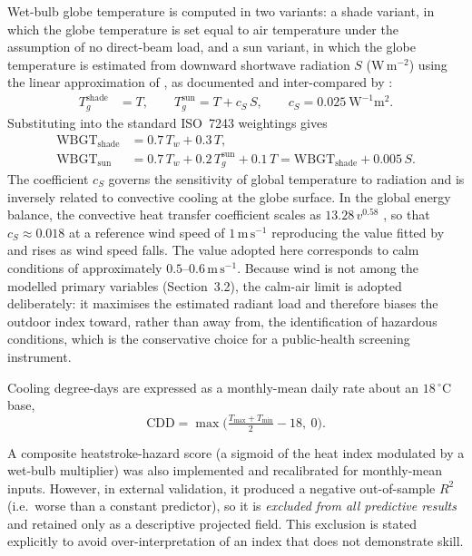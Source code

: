 \documentclass[pdflatex,sn-basic,lineno]{sn-jnl}
\newcommand{\degC}{\ensuremath{^{\circ}\mathrm{C}}}
\begin{document}
Wet-bulb globe temperature is computed in two variants: a shade variant, in
which the globe temperature is set equal to air temperature under the
assumption of no direct-beam load, and a sun variant, in which the globe
temperature is estimated from downward shortwave radiation $S$
(W\,m$^{-2}$) using the linear approximation of \citet{tonouchi2006}, as
documented and inter-compared by
\citet{lemke2012}:
\begin{align}
T_g^{\text{shade}} &= T, \qquad
T_g^{\text{sun}} = T + c_S\,S, \qquad c_S = 0.025\ \mathrm{W^{-1}m^{2}}.
\end{align}
Substituting into the standard ISO~7243 weightings
\citep{iso7243_2017,yaglou1957} gives
\begin{align}
\mathrm{WBGT_{shade}} &= 0.7\,T_w + 0.3\,T, \\
\mathrm{WBGT_{sun}}   &= 0.7\,T_w + 0.2\,T_g^{\text{sun}} + 0.1\,T
                       = \mathrm{WBGT_{shade}} + 0.005\,S .
\end{align}
The coefficient $c_S$ governs the sensitivity of global temperature to
radiation and is inversely related to convective cooling at the globe
surface. In the global energy balance, the convective heat transfer
coefficient scales as $13.28\,v^{0.58}$ \citep{lemke2012}, so that
$c_S \approx 0.018$ at a reference wind speed of $1\,\mathrm{m\,s^{-1}}$ reproducing the value fitted by \citet{tonouchi2006} and rises as
wind speed falls. The value adopted here corresponds to calm conditions of
approximately $0.5$--$0.6\,\mathrm{m\,s^{-1}}$. Because wind is not among
the modelled primary variables (Section~3.2), the calm-air limit is
adopted deliberately: it maximises the estimated radiant load and
therefore biases the outdoor index toward, rather than away from, the
identification of hazardous conditions, which is the conservative choice
for a public-health screening instrument.

Cooling degree-days are expressed as a monthly-mean daily rate about an
$18\,\degC$ base,
\begin{equation}
\mathrm{CDD}=\max\!\Big(\tfrac{T_{\max}+T_{\min}}{2}-18,\ 0\Big).
\label{eq:cdd}
\end{equation}

A composite heatstroke-hazard score (a sigmoid of the heat index modulated by a
wet-bulb multiplier) was also implemented and recalibrated for monthly-mean
inputs. However, in external validation, it produced a negative out-of-sample
$R^{2}$ (i.e.\ worse than a constant predictor), so it is \emph{excluded from all
predictive results} and retained only as a descriptive projected field. This
exclusion is stated explicitly to avoid over-interpretation of an index that
does not demonstrate skill.
\end{document}
